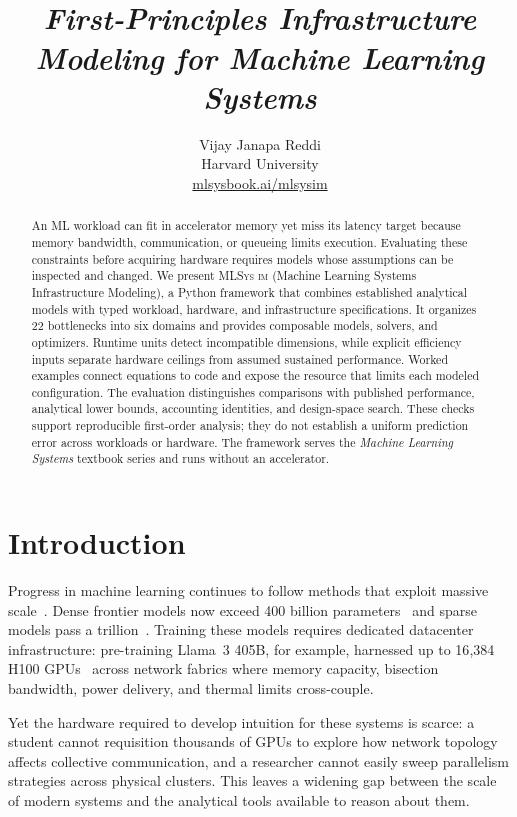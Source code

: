 \documentclass[10pt,twocolumn]{article}
\title{
  {\Huge\bfseries \mlsysim}\\[0.4em]
  \Large\normalfont\itshape First-Principles Infrastructure Modeling for Machine Learning Systems
}
\author{
  \fontsize{12}{15}\selectfont
  Vijay Janapa Reddi\\[0.2em]
  \fontsize{11}{14}\selectfont
  Harvard University\\[0.6em]
  \fontsize{10}{12}\selectfont
  \textcolor{gray!60}{\href{https://mlsysbook.ai/mlsysim}{mlsysbook.ai/mlsysim}}
}
\date{}
\newcommand{\mlsysim}{\mbox{\textsc{MLSys}\,\textperiodcentered\,\textsc{im}}\xspace}
\begin{document}
\maketitle
\vspace{-1.5em}

\begin{abstract}
An ML workload can fit in accelerator memory yet miss its latency target because memory bandwidth, communication, or queueing limits execution. Evaluating these constraints before acquiring hardware requires models whose assumptions can be inspected and changed. We present \mlsysim{} (Machine Learning Systems Infrastructure Modeling), a Python framework that combines established analytical models with typed workload, hardware, and infrastructure specifications. It organizes 22 bottlenecks into six domains and provides \CountResolvers{} composable models, solvers, and optimizers. Runtime units detect incompatible dimensions, while explicit efficiency inputs separate hardware ceilings from assumed sustained performance. Worked examples connect equations to code and expose the resource that limits each modeled configuration. The evaluation distinguishes comparisons with published performance, analytical lower bounds, accounting identities, and design-space search. These checks support reproducible first-order analysis; they do not establish a uniform prediction error across workloads or hardware. The framework serves the \emph{Machine Learning Systems} textbook series and runs without an accelerator.
\end{abstract}

\section{Introduction}
\label{sec:intro}

Progress in machine learning continues to follow methods that exploit massive scale~\citep{sutton2019bitter}. Dense frontier models now exceed 400 billion parameters~\citep{llama3team2024} and sparse models pass a trillion~\citep{fedus2022switch}. Training these models requires dedicated datacenter infrastructure: pre-training Llama~3 405B, for example, harnessed up to 16{,}384 H100 GPUs~\citep{llama3team2024} across network fabrics where memory capacity, bisection bandwidth, power delivery, and thermal limits cross-couple.

Yet the hardware required to develop intuition for these systems is scarce: a student cannot requisition thousands of GPUs to explore how network topology affects collective communication, and a researcher cannot easily sweep parallelism strategies across physical clusters. This leaves a widening gap between the scale of modern systems and the analytical tools available to reason about them.
\end{document}

